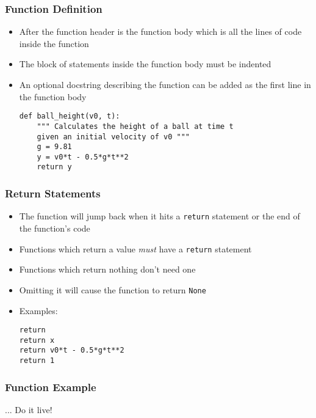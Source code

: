 \documentclass[english,14pt]{beamer}
\begin{document}
\begin{frame}[fragile]
\frametitle{Function Definition}
\begin{itemize}
    \item After the function header is the function body which is all the lines of code inside the function
    \item The block of statements inside the function body must be indented  
    \item An optional docstring describing the function can be added as the first line in the function body

\begin{lstlisting}[style=CStyle]
def ball_height(v0, t):       
    """ Calculates the height of a ball at time t
    given an initial velocity of v0 """
    g = 9.81                    
    y = v0*t - 0.5*g*t**2
    return y                    
\end{lstlisting}
\end{itemize}
\end{frame}

\begin{frame}[fragile]
\frametitle{Return Statements}
\begin{itemize}
    \item The function will jump back when it hits a \texttt{return} statement or the end of the function's code
	\item Functions which return a value \textit{must} have a \texttt{return} statement
	\item Functions which return nothing don't need one
	\item Omitting it will cause the function to return \texttt{None}
    \item Examples:
    \begin{lstlisting}[style=CStyle] 
return  
return x          
return v0*t - 0.5*g*t**2 
return 1          
\end{lstlisting} %
\end{itemize}
\end{frame}


\begin{frame}
\frametitle{Function Example}
\begin{center}
... Do it live!
\end{center}
\end{frame}
\end{document}
